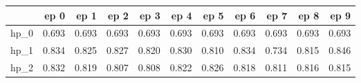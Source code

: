 \begin{tabular}{lrrrrrrrrrr}
\toprule
{} &   ep 0 &   ep 1 &   ep 2 &   ep 3 &   ep 4 &   ep 5 &   ep 6 &   ep 7 &   ep 8 &   ep 9 \\
\midrule
hp\_0 &  0.693 &  0.693 &  0.693 &  0.693 &  0.693 &  0.693 &  0.693 &  0.693 &  0.693 &  0.693 \\
hp\_1 &  0.834 &  0.825 &  0.827 &  0.820 &  0.830 &  0.810 &  0.834 &  0.734 &  0.815 &  0.846 \\
hp\_2 &  0.832 &  0.819 &  0.807 &  0.808 &  0.822 &  0.826 &  0.818 &  0.811 &  0.816 &  0.815 \\
\bottomrule
\end{tabular}
